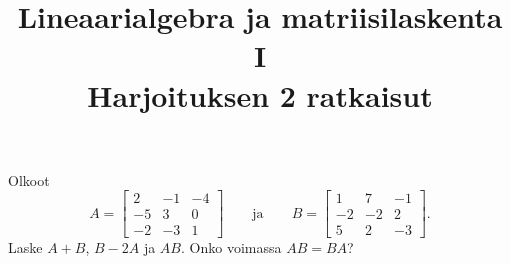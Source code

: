 \documentclass[11pt,a4paper]{amsart}
\title{Lineaarialgebra ja matriisilaskenta I\\Harjoituksen 2 ratkaisut}
\author{}
\date{}
\begin{document}

\begin{exercise}
  Olkoot
  \[
    A =
    \begin{bmatrix}
      2 & -1 & -4 \\
      -5 & 3 & 0 \\
      -2 & -3 & 1
    \end{bmatrix}
    \qquad\text{ja}\qquad
    B =
    \begin{bmatrix}
      1 & 7 & -1 \\
      -2 & -2 & 2 \\
      5 & 2 & -3
    \end{bmatrix}.
  \]
  Laske \(A+B\), \(B-2A\) ja \(AB\). Onko voimassa \(AB=BA\)?
\end{exercise}
\end{document}
